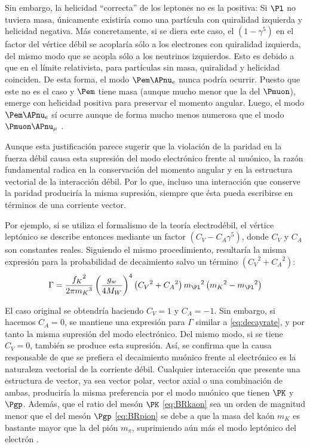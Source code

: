 Sin embargo, la helicidad ``correcta'' de los leptones no es la positiva: Si $\Pl$ no tuviera masa, únicamente existiría como una partícula con quiralidad izquierda y helicidad negativa. Más concretamente, si se diera este caso, el $\left( 1-\gamma^{5} \right)$ en el factor del vértice débil se acoplaría sólo a los electrones con quiralidad izquierda, del mismo modo que se acopla sólo a los neutrinos izquierdos. Esto es debido a que en el límite relativista, para partículas sin masa, quiralidad y helicidad coinciden. De esta forma, el modo $\Pem \APnu_{e}$ nunca podría ocurrir. Puesto que este no es el caso y $\Pem$ tiene masa (aunque mucho menor que la del $\Pmuon$), emerge con helicidad positiva para preservar el momento angular. Luego, el modo $\Pem \APnu_{e}$ sí ocurre aunque de forma mucho menos numerosa que el modo $\Pmuon \APnu_{\mu}$ \cite{Griffiths2008} \cite{Halzen}.

Aunque esta justificación parece sugerir que la violación de la paridad en la fuerza débil causa esta supresión del modo electrónico frente al muónico, la razón fundamental radica en la conservación del momento angular y en la estructura vectorial de la interacción débil. Por lo que, incluso una interacción que conserve la paridad produciría la misma supresión, siempre que ésta pueda escribirse en términos de una corriente vector. 

Por ejemplo, si se utiliza el formalismo de la teoría electrodébil, el vértice leptónico se describe entonces mediante un factor $\left( C_{V}-C_{A}\gamma^{5} \right)$, donde $C_{V}$ y $C_{A}$ son constantes reales. Siguiendo el mismo procedimiento, resultaría la misma expresión para la probabilidad de decaimiento salvo un término $\left( {C_{V}}^2+{C_{A}}^2\right)$:
\begin{equation}
\Gamma =\dfrac{{f_{K}}^{2}}{2\pi {m_{K}}^{3}}\left( \dfrac{g_w}{4M_W}\right)^{4}\left( {C_{V}}^2+{C_{A}}^2\right){m_{\Pl}}^{2}\left({m_{K}}^{2}-{m_{\Pl}}^{2}\right)\label{eq:decayrateEWt}
\end{equation}

El caso original se obtendría haciendo $C_{V}=1$ y $C_{A}=-1$. Sin embargo, si hacemos $C_{A}=0$, se mantiene una expresión para $\Gamma$ similar a \ref{eq:decayrate}, y por tanto la misma supresión del modo electrónico. Del mismo modo, si se tiene $C_{V}=0$, también se produce esta supresión. Así, se confirma que la causa responsable de que se prefiera el decaimiento muónico frente al electrónico es la naturaleza vectorial de la corriente débil. Cualquier interacción que presente una estructura de vector, ya sea vector polar, vector axial o una combinación de ambas, produciría la misma preferencia por el modo muónico que tienen $\PK$ y $\Pgp$. Además, que el ratio del mesón $\PK$ \ref{eq:BRkaon} sea un orden de magnitud menor que el del mesón $\Pgp$ \ref{eq:BRpion} se debe a que la masa del kaón $m_{K}$ es bastante mayor que la del pión $m_{\pi}$, suprimiendo aún más el modo leptónico del electrón \cite{Renton}.

